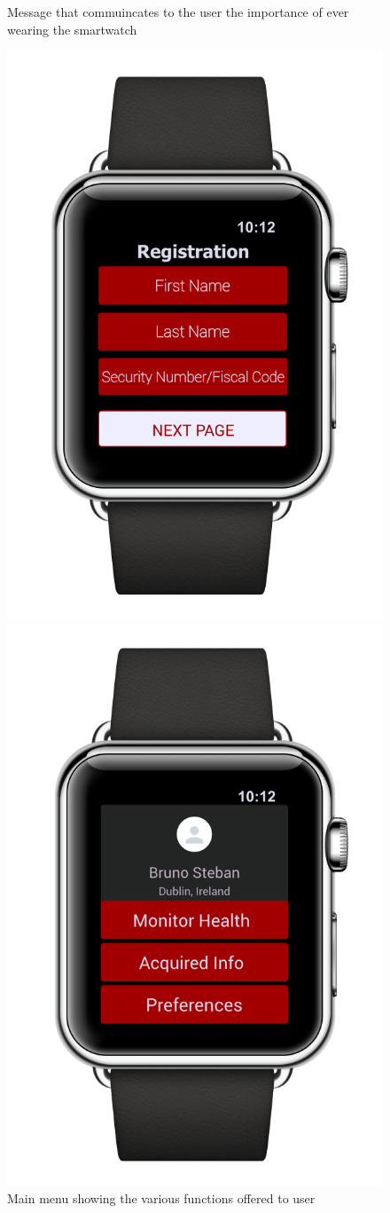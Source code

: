 \begin{enumerate}
\begin{figure}[H]
\begin{center}
\begin{minipage}[c]{.40\textwidth}
	\caption{Message that commuincates to the user the importance of ever wearing the smartwatch}
        \end{minipage}
      \end{center}
\end{figure}
\begin{figure}[H]
\begin{center}
        \begin{minipage}[c]{.35\textwidth}
	\centering
          \includegraphics[height=9 cm]{Images/Mockups/AutomatedSOSMockup5.png}
	\caption{Main menu showing the various functions offered to user}
        \end{minipage}%
        \hspace{10mm}%
        \begin{minipage}[c]{.40\textwidth}
	\centering
          \includegraphics[height=9 cm]{Images/Mockups/AutomatedSOSMockup6.png}

\end{minipage}
\end{center}
\end{figure}
\end{enumerate}
